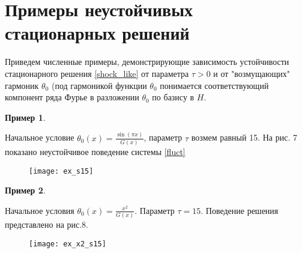 \section{Примеры неустойчивых стационарных решений}

Приведем численные примеры, демонстрирующие зависимость устойчивости
стационарного решения \eqref{shock_like} от параметра $\tau > 0$ и от
"возмущающих" гармоник $\theta_0$ (под гармоникой функции $\theta_0$ понимается
соответствующий компонент ряда Фурье в разложении $\theta_0$ по базису в $H$.
\newtheorem{exmp_bur}{Пример}
\begin{exmp_bur}
\end{exmp_bur}

Начальное условие $\theta_0(x) = \frac{\sin(\pi x)}{G(x)}$, параметр $\tau$ 
возмем равный 15. На рис. 7 показано неустойчивое поведение системы
\eqref{fluct}

\begin{figure}[h]
    \centering
    \texttt{[image: ex\_s15]}
    \caption{}
    \label{fig:fig07}
\end{figure}

\begin{exmp_bur}
\end{exmp_bur}
Начальное условия $\theta_0(x) = \frac{x^2}{G(x)}$. Параметр $\tau = 15$.
Поведение решения представлено на рис.8.

\begin{figure}[h]
    \centering
    \texttt{[image: ex\_x2\_s15]}
    \caption{}
    \label{fig:fig08}
\end{figure}
